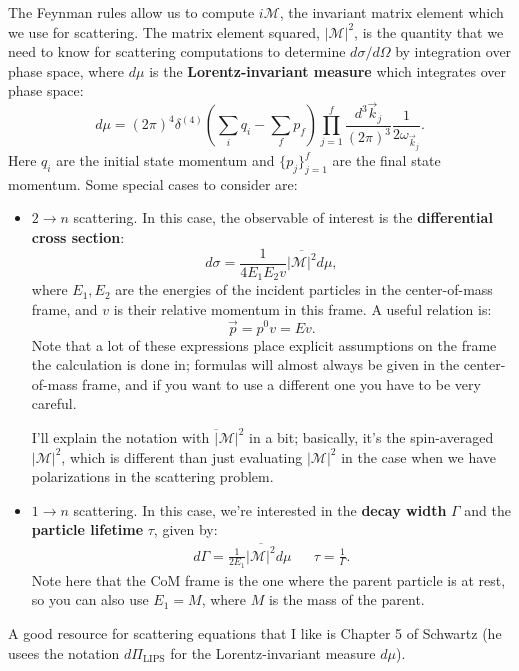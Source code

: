 \documentclass[12pt, oneside]{article}   	%
\theoremstyle{definition}
\begin{document}
The Feynman rules allow us to compute $i\mathcal M$, the invariant matrix element which we use for scattering. The matrix element squared, $|\mathcal M|^2$, is the quantity that we need to know for scattering computations to determine $d\sigma / d\Omega$ by integration over phase space, where $d\mu$ is the \textbf{Lorentz-invariant measure} which integrates over phase space:
\begin{equation}
	d\mu = (2\pi)^4 \delta^{(4)}\left(\sum_i q_i - \sum_f p_f\right)\prod_{j = 1}^f \frac{d^3\vec k_j}{(2\pi)^3} \frac{1}{2\omega_{\vec k_j}}. 
\end{equation}
Here $q_i$ are the initial state momentum and $\{p_j\}_{j = 1}^f$ are the final state momentum. Some special cases to consider are:
\begin{itemize}
	\item $2\rightarrow n$ scattering. In this case, the observable of interest is the \textbf{differential cross section}:
	\begin{equation}
		d\sigma = \frac{1}{4 E_1 E_2 v} \overline{|\mathcal M|^2} d\mu,
	\end{equation}
	where $E_1, E_2$ are the energies of the incident particles in the center-of-mass frame, and $v$ is their relative momentum in this frame. A useful relation is:
	\begin{equation}
		\vec p = p^0 v = E v.
	\end{equation}
	Note that a lot of these expressions place explicit assumptions on the frame the calculation is done in; formulas will almost always be given in the center-of-mass frame, and if you want to use a different one you have to be very careful. 
	
	I'll explain the notation with $\overline |\mathcal M|^2$ in a bit; basically, it's the spin-averaged $|\mathcal M|^2$, which is different than just evaluating $|\mathcal M|^2$ in the case when we have polarizations in the scattering problem. 
	\item $1\rightarrow n$ scattering. In this case, we're interested in the \textbf{decay width} $\Gamma$ and the \textbf{particle lifetime} $\tau$, given by:
	\begin{align}
		d\Gamma = \frac{1}{2E_1} \overline{|\mathcal M|^2} d\mu && \tau = \frac{1}{\Gamma}. 
	\end{align}
	Note here that the CoM frame is the one where the parent particle is at rest, so you can also use $E_1 = M$, where $M$ is the mass of the parent. 
\end{itemize}
A good resource for scattering equations that I like is Chapter 5 of Schwartz (he usees the notation $d\Pi_\mathrm{LIPS}$ for the Lorentz-invariant measure $d\mu$). 
\end{document}
